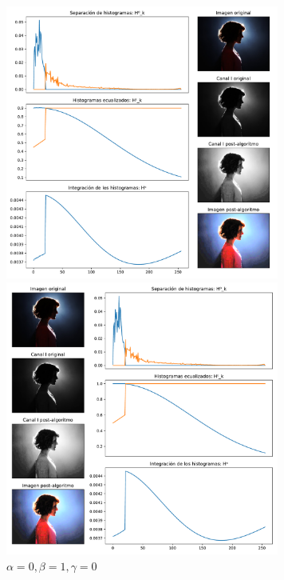 \begin{figure}[H]
\begin{minipage}[c]{0.48\linewidth}
  \includegraphics[height=9cm]{imgs/wom-1-9-0.pdf}
  \caption{$\alpha = 0.1, \beta = 0.9, \gamma = 0$}
\end{minipage}
\hfill
\begin{minipage}[c]{0.48\linewidth}
  \includegraphics[height=9cm]{imgs/wom-0-1-0.pdf}
  \caption{$\alpha = 0, \beta = 1, \gamma = 0$}
\end{minipage}%
\end{figure}

